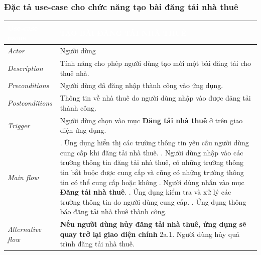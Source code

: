 \subsubsection{Đặc tả use-case cho chức năng tạo bài đăng tải nhà thuê}
\begin{center}
    \arrayrulewidth=2pt
    \begin{longtable}{
        |>{\raggedright\arraybackslash}p{3cm}
        |>{\raggedright\arraybackslash}p{13cm}
        |}
        \hline
        \rowcolor{cyan!75!black} \textcolor{white}{\textbf{Use-case name}} & \textcolor{white}{\textbf{TẠO BÀI ĐĂNG TẢI NHÀ THUÊ}}
        \\\hline
        \rowcolor{cyan!10!white} \textit{Actor} & Người dùng
        \\\hdashline
        \rowcolor{cyan!10!white} \textit{Description} & Tính năng cho phép người dùng tạo mới một bài đăng tải cho thuê nhà.
        \\\hdashline
        \rowcolor{cyan!10!white} \textit{Preconditions} & Người dùng đã đăng nhập thành công vào ứng dụng.
        \\\hdashline
        \rowcolor{cyan!10!white} \textit{Postconditions} & Thông tin về nhà thuê do người dùng nhập vào được đăng tải thành công.
        \\\hdashline
        \rowcolor{cyan!10!white} \textit{Trigger} & Người dùng chọn vào mục \textbf{Đăng tải nhà thuê} ở trên giao diện ứng dụng.
        \\\hdashline
        \rowcolor{cyan!10!white} \textit{Main flow} &
        1. Ứng dụng hiển thị các trường thông tin yêu cầu người dùng cung cấp khi đăng tải nhà thuê. \newline
        2. Người dùng nhập vào các trường thông tin đăng tải nhà thuê, có những trường thông tin bắt buộc được cung cấp và cũng có những trường thông tin có thể cung cấp hoặc không \newline
        3. Người dùng nhấn vào mục \textbf{Đăng tải nhà thuê}. \newline
        4. Ứng dụng kiểm tra và xử lý các trường thông tin do người dùng cung cấp. \newline
        5. Ứng dụng thông báo đăng tải nhà thuê thành công.
        \\\hdashline
        \rowcolor{cyan!10!white} \textit{Alternative flow} & 
        \textbf{Nếu người dùng hủy đăng tải nhà thuê, ứng dụng sẽ quay trở lại giao diện chính} \newline
        2a.1. Người dùng hủy quá trình đăng tải nhà thuê. \newline

\end{longtable}
\end{center}
